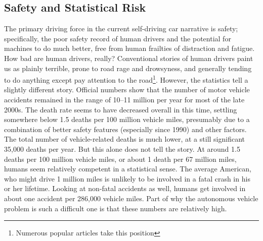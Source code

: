 \subsection{Safety and Statistical Risk}


The primary driving force in the current self-driving car
narrative is safety; specifically, the poor safety record of human
drivers and the potential for machines to do much better, free from
human frailties of distraction and fatigue. How bad are human
drivers, really? Conventional stories of human drivers paint us as
plainly terrible, prone to road rage and drowsyness, and generally tending
to do anything except pay attention to the road\footnote{Numerous popular
  articles take this position\cite{???}}. However, the statistics tell
a slightly different story. Official numbers show that the number of
motor vehicle accidents remained in the range of 10--11 million
per year for most of the late 2000s. The death rate seems to have
decreased overall in this time, settling somewhere below 1.5 deaths
per 100 million vehicle miles, presumably due to a combination of
better safety features (especially since 1990) and other
factors.\cite{???} The total number of vehicle-related deaths is much
lower, at a still significant 35,000 deaths per year. But this alone
does not tell the story. At around 1.5 deaths per 100 million vehicle
miles, or about 1 death per 67 million miles, humans seem relatively
competent in a statistical sense. The average American, who might
drive 1 million miles\cite{???} is unlikely to be
involved in a fatal crash in his or her lifetime. Looking at non-fatal
accidents as well, humans get involved in about one accident per
286,000 vehicle miles. Part of why the autonomous vehicle problem is
such a difficult one is that these numbers are relatively high.

